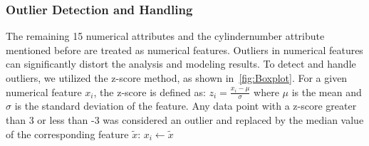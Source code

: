 \documentclass{article} %
\begin{document}
\subsubsection{Outlier Detection and Handling}
The remaining 15 numerical attributes and the cylindernumber attribute mentioned before are treated as numerical features.
Outliers in numerical features can significantly distort the analysis and modeling results. To detect and handle outliers, we utilized the z-score method, as shown in~\autoref{fig:Boxplot}. For a given numerical feature \( x_i \), the z-score is defined as:
$
z_i = \frac{x_i - \mu}{\sigma}
$
where \( \mu \) is the mean and \( \sigma \) is the standard deviation of the feature. Any data point with a z-score greater than 3 or less than -3 was considered an outlier and replaced by the median value of the corresponding feature \( \tilde{x} \):
$
x_i \leftarrow \tilde{x}
$
\end{document}
